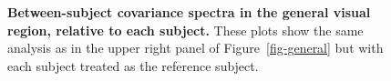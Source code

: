 \documentclass[10pt]{article}
\begin{document}
\begin{figure}[H]


\caption{\label{fig-general-all}\textbf{Between-subject covariance
spectra in the general visual region, relative to each subject.} These
plots show the same analysis as in the upper right panel of
Figure~\ref{fig-general} but with each subject treated as the reference
subject.}

\end{figure}%
\end{document}
